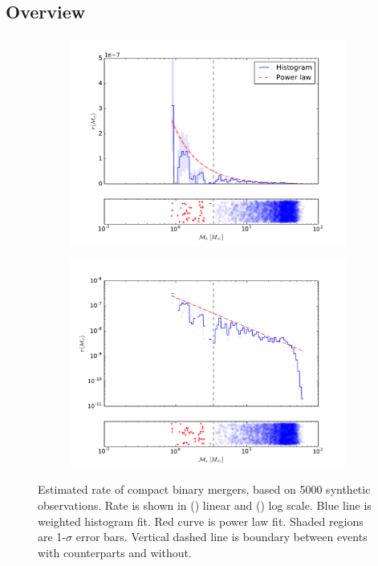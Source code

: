 \subsection{Overview}

\begin{figure}[ht]
  \centering
  \begin{subfigure}[c]{\textwidth}
    \centering
    \includegraphics[height=0.4\textheight]{img/chirp-mass-distribution}
    \caption{}
    \label{fig:chirp-linear}
  \end{subfigure}

  \begin{subfigure}[c]{\textwidth}
    \centering
    \includegraphics[height=0.4\textheight]{img/chirp-mass-log-distribution}
    \caption{}
    \label{fig:chirp-log}
  \end{subfigure}

  \caption{Estimated rate of compact binary mergers, based on 5000 synthetic observations. Rate is shown in () linear and () log scale. Blue line is weighted histogram fit. Red curve is power law fit. Shaded regions are 1-$\sigma$ error bars. Vertical dashed line is boundary between events with counterparts and without.}
  \label{fig:chirp}
\end{figure}

